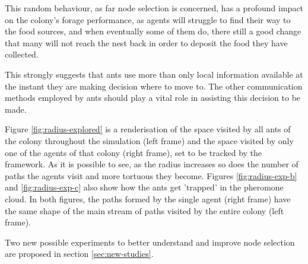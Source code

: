 This random behaviour, as far node selection is concerned, has a profound impact on the colony's forage performance, as agents will struggle to find their way to the food sources, and when eventually some of them do, there still a good change that many will not reach the nest back in order to deposit the food they have collected.  

This strongly suggests that ants use more than only local information available at the instant they are making decision where to move to. The other communication methods employed by ants should play a vital role in assisting this decision to be made.

Figure \ref{fig:radius-explored} is a renderisation  of the space visited by all ants of the colony throughout the simulation (left frame) and the space visited by only one of the agents of that colony (right frame), set to be tracked by the framework. As it is possible to see, as the radius increases so does the number of paths the agents visit and more tortuous they become. Figures \ref{fig:radius-exp-b} and \ref{fig:radius-exp-c} also show how the ants get 'trapped' in the pheromone cloud. In both figures, the paths formed by the single agent (right frame) have the same shape of the main stream of paths visited by the entire colony (left frame). 


Two new possible experiments to better understand and improve node selection are proposed in section \ref{sec:new-studies}.

